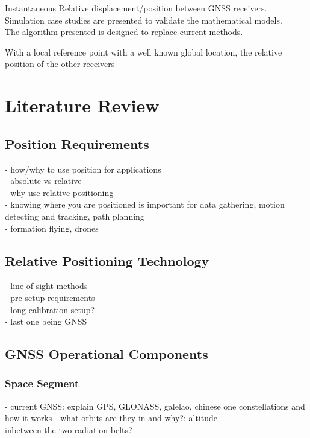 \documentclass[11pt,a4paper]{article}
\begin{document}
Instantaneous Relative displacement/position between GNSS receivers.\\
Simulation case studies are presented to validate the mathematical models.\\

The algorithm presented is designed to replace current methods.

With a local reference point with a well known global location, the relative position of the other receivers 


\section{Literature Review}

\subsection{Position Requirements}
- how/why to use position for applications\\
- absolute vs relative\\
- why use relative positioning\\
- knowing where you are positioned is important for data gathering, motion detecting and tracking, path planning\\
- formation flying, drones\\
\subsection{Relative Positioning Technology}
- line of sight methods\\
- pre-setup requirements\\
- long calibration setup?\\


- last one being GNSS
\subsection{GNSS Operational Components}
\subsubsection{Space Segment}
- current GNSS: explain GPS, GLONASS, galelao, chinese one constellations and how it works
- what orbits are they in and why?: altitude\\
inbetween the two radiation belts?
\end{document}
